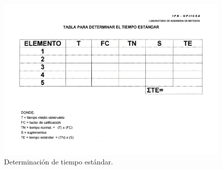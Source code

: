     \begin{figure}[H]
      \centering
      \includegraphics[scale=0.3]{15/img/tablaTiempoEstandar.pdf}
      \caption{Determinación de tiempo estándar.}
      \label{fig:tiempoEstandar}
  \end{figure}
   
     
    
    
